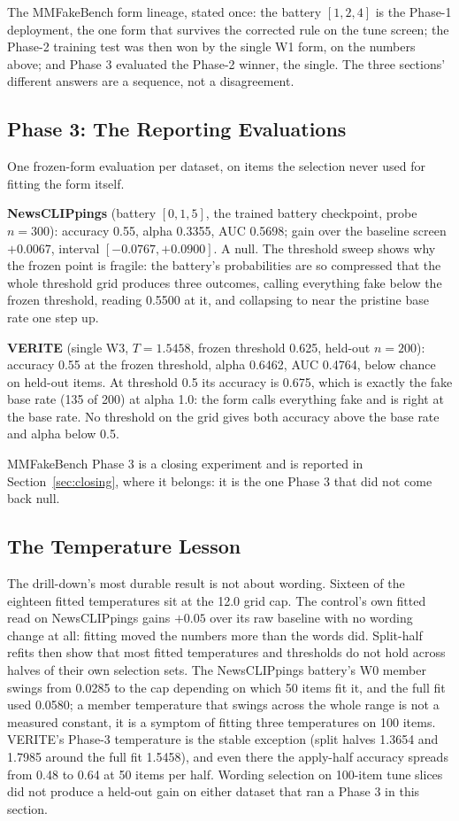 \documentclass{article} %
\begin{document}
The MMFakeBench form lineage, stated once: the battery \([1, 2, 4]\) is the Phase-1 deployment, the one form that survives the corrected rule on the tune screen; the Phase-2 training test was then won by the single W1 form, on the numbers above; and Phase 3 evaluated the Phase-2 winner, the single. The three sections' different answers are a sequence, not a disagreement.

\subsection{Phase 3: The Reporting Evaluations}
One frozen-form evaluation per dataset, on items the selection never used for fitting the form itself.

\textbf{NewsCLIPpings} (battery \([0, 1, 5]\), the trained battery checkpoint, probe \(n=300\)): accuracy 0.55, alpha 0.3355, AUC 0.5698; gain over the baseline screen \(+0.0067\), interval \([-0.0767, +0.0900]\). A null. The threshold sweep shows why the frozen point is fragile: the battery's probabilities are so compressed that the whole threshold grid produces three outcomes, calling everything fake below the frozen threshold, reading 0.5500 at it, and collapsing to near the pristine base rate one step up.

\textbf{VERITE} (single W3, \(T=1.5458\), frozen threshold 0.625, held-out \(n=200\)): accuracy 0.55 at the frozen threshold, alpha 0.6462, AUC 0.4764, below chance on held-out items. At threshold 0.5 its accuracy is 0.675, which is exactly the fake base rate (135 of 200) at alpha 1.0: the form calls everything fake and is right at the base rate. No threshold on the grid gives both accuracy above the base rate and alpha below 0.5.

MMFakeBench Phase 3 is a closing experiment and is reported in Section~\ref{sec:closing}, where it belongs: it is the one Phase 3 that did not come back null.

\subsection{The Temperature Lesson}
The drill-down's most durable result is not about wording. Sixteen of the eighteen fitted temperatures sit at the 12.0 grid cap. The control's own fitted read on NewsCLIPpings gains \(+0.05\) over its raw baseline with no wording change at all: fitting moved the numbers more than the words did. Split-half refits then show that most fitted temperatures and thresholds do not hold across halves of their own selection sets. The NewsCLIPpings battery's W0 member swings from 0.0285 to the cap depending on which 50 items fit it, and the full fit used 0.0580; a member temperature that swings across the whole range is not a measured constant, it is a symptom of fitting three temperatures on 100 items. VERITE's Phase-3 temperature is the stable exception (split halves 1.3654 and 1.7985 around the full fit 1.5458), and even there the apply-half accuracy spreads from 0.48 to 0.64 at 50 items per half. Wording selection on 100-item tune slices did not produce a held-out gain on either dataset that ran a Phase 3 in this section.
\end{document}
